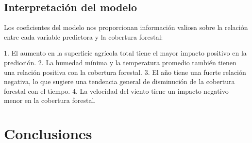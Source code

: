 \documentclass[11pt]{article}
\begin{document}
\subsection{Interpretación del modelo}

Los coeficientes del modelo nos proporcionan información valiosa sobre la relación entre cada variable predictora y la cobertura forestal:

1. El aumento en la superficie agrícola total tiene el mayor impacto positivo en la predicción.
2. La humedad mínima y la temperatura promedio también tienen una relación positiva con la cobertura forestal.
3. El año tiene una fuerte relación negativa, lo que sugiere una tendencia general de disminución de la cobertura forestal con el tiempo.
4. La velocidad del viento tiene un impacto negativo menor en la cobertura forestal.

\section{Conclusiones}

 
\end{document}

